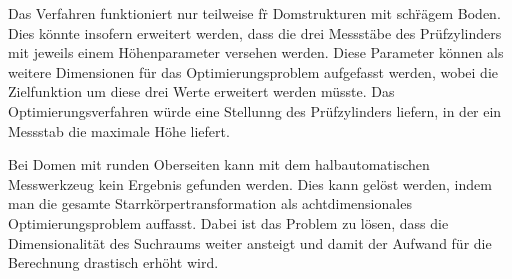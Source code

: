 Das Verfahren funktioniert nur teilweise f\"r Domstrukturen mit sch\"rägem Boden. Dies k\"onnte insofern erweitert werden, dass die drei Messst\"abe des Pr\"ufzylinders mit jeweils einem H\"ohenparameter versehen werden. Diese Parameter k\"onnen als weitere Dimensionen f\"ur das Optimierungsproblem aufgefasst werden, wobei die Zielfunktion um diese drei Werte erweitert werden m\"usste.
Das Optimierungsverfahren w\"urde eine Stellunng des Pr\"ufzylinders liefern, in der ein Messstab die maximale H\"ohe liefert.

Bei Domen mit runden Oberseiten kann mit dem halbautomatischen Messwerkzeug kein Ergebnis gefunden werden. Dies kann gel\"ost werden, indem man die gesamte Starrk\"orpertransformation als achtdimensionales Optimierungsproblem auffasst. Dabei ist das Problem zu lösen, dass die Dimensionalität des Suchraums weiter ansteigt und damit der Aufwand f\"ur die Berechnung drastisch erh\"oht wird.





